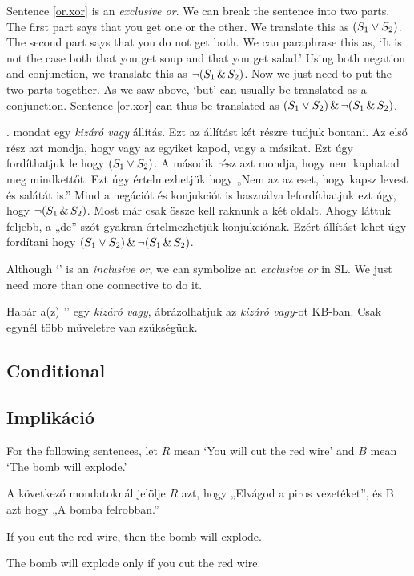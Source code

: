 Sentence \ref{or.xor} is an \emph{exclusive or}. We can break the sentence into two parts. The first part says that you get one or the other. We translate this as $(S_1 \vee S_2)$. The second part says that you do not get both. We can paraphrase this as, `It is not the case both that you get soup and that you get salad.' Using both negation and conjunction, we translate this as $\neg(S_1 \,\&\, S_2)$. Now we just need to put the two parts together. As we saw above, `but' can usually be translated as a conjunction. Sentence \ref{or.xor} can thus be translated as $(S_1 \vee S_2) \,\&\, \neg(S_1 \,\&\, S_2)$.

. mondat egy \emph{kizáró vagy} állítás. Ezt az állítást két részre tudjuk bontani. Az első rész azt mondja, hogy vagy az egyiket kapod, vagy a másikat. Ezt úgy fordíthatjuk le hogy $(S_1 \vee S_2)$. A második rész azt mondja, hogy nem kaphatod meg mindkettőt. Ezt úgy értelmezhetjük hogy „Nem az az eset, hogy kapsz levest és salátát is.” Mind a negációt és konjukciót is használva lefordíthatjuk ezt úgy, hogy $\neg(S_1 \,\&\, S_2)$. Most már csak össze kell raknunk a két oldalt. Ahogy láttuk feljebb, a „de” szót gyakran értelmezhetjük konjukciónak. Ezért  állítást lehet úgy fordítani hogy $(S_1 \vee S_2) \,\&\, \neg(S_1 \,\&\, S_2)$.

Although `\eor' is an \emph{inclusive or}, we can symbolize an \emph{exclusive or} in {SL}. We just need more than one connective to do it.

Habár a(z) '\eor' egy  \emph{kizáró vagy}, ábrázolhatjuk az \emph{kizáró vagy}-ot {KB}-ban. Csak egynél több műveletre van szükségünk.


\subsection*{Conditional}
\subsection{Implikáció}

For the following sentences, let $R$ mean `You will cut the red wire' and $B$ mean `The bomb will explode.'

A következő mondatoknál jelölje $R$ azt, hogy „Elvágod a piros vezetéket”, és B azt hogy „A bomba felrobban.”

\begin{earg}
\item[\ex{if1}] If you cut the red wire, then the bomb will explode.
\item[\ex{if2}] The bomb will explode only if you cut the red wire.
\end{earg}

